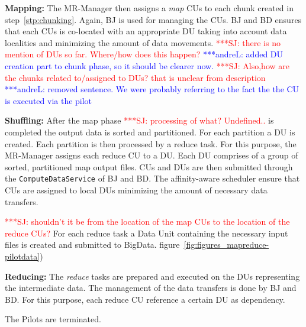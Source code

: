 \documentclass{acm_proc_article-sp}
\newcommand{\jhanote}[1]{ {\textcolor{red} { ***SJ: #1 }}}
\newcommand{\alnote}[1]{ {\textcolor{blue} { ***andreL: #1 }}}
\newcommand{\pnote}[1]{ {\textcolor{magenta} { ***pradeep: #1 }}}
\newcommand{\alnote}[1]{}
\newcommand{\pnote}[1]{}
\newcommand{\jhanote}[1]{}
\newcommand{\pilots}{Pilots\xspace}
\newcommand{\mrmg}{MR-Manager\xspace}
\newcommand{\cus}{CUs\xspace}
\newcommand{\du}{DU\xspace}
\newcommand{\dus}{DUs\xspace}
\begin{document}
\begin{compactenum}[A.]
\item \textbf{Mapping:} The \mrmg then assigns a {\it map} CUs to each chunk 
created in step~\ref{stp:chunking}. Again, BJ is used for managing the CUs. BJ
and BD ensures that each CUs is co-located with an appropriate DU taking into account data localities and minimizing the amount of data movements. \jhanote{there is no
    mention of DUs so far. Where/how does this happen?} \alnote{added DU 
    creation part to chunk phase, so it should be clearer now.}
\jhanote{Also,how are the chunks related to/assigned to DUs? that is unclear
    from description}\alnote{removed sentence. We were probably referring to the fact the the CU is executed via the pilot}
	
\item \textbf{Shuffling:} %
   After the map phase \jhanote{processing of what? Undefined..} is completed
   the output data is sorted and partitioned. For each partition a \du is
   created. Each partition is then processed by a reduce task. For this purpose, 
   the \mrmg assigns each reduce CU to a DU. Each DU comprises of a
   group of sorted, partitioned map output files. \cus and \dus are then
   submitted through the \texttt{ComputeDataService} of BJ and BD. The 
   affinity-aware scheduler ensure that \cus are assigned to local \dus minimizing the amount
   of necessary data transfers.

\jhanote{shouldn't it
    be from the location of the map CUs to the location of the reduce
    CUs?} For each reduce task a Data Unit containing the necessary
  input files is created and submitted to BigData. %
  figure~\ref{fig:figures_mapreduce-pilotdata})
		
	
\item \textbf{Reducing:} The {\it reduce} tasks are prepared and
  executed on the DUs representing the intermediate data.
  The management of the data transfers is done by BJ and BD. For this
  purpose, each reduce CU reference a certain DU as dependency.
	
\item The \pilots are terminated.

\end{compactenum}
\end{document}
